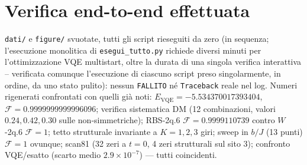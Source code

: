 \documentclass[11pt,a4paper]{article}
\begin{document}
\section{Verifica end-to-end effettuata}

\texttt{dati/} e \texttt{figure/} svuotate, tutti gli script rieseguiti
da zero (in sequenza; l'esecuzione monolitica di
\texttt{esegui\_tutto.py} richiede diversi minuti per l'ottimizzazione
VQE multistart, oltre la durata di una singola verifica interattiva --
verificata comunque l'esecuzione di ciascuno script preso singolarmente,
in ordine, da uno stato pulito): nessun \texttt{FALLITO} né
\texttt{Traceback} reale nel log. Numeri rigenerati confrontati con
quelli già noti: $E_\text{VQE}=-5.534370017393404$,
$\mathcal F=0.9999999999996096$; verifica sistematica DM (12
combinazioni, valori $0.24,0.42,0.30$ sulle non-simmetriche); RBS-2q.6
$\mathcal F=0.9999110739$ contro $W$-2q.6 $\mathcal F=1$; tetto
strutturale invariante a $K=1,2,3$ giri; sweep in $b/J$ (13 punti)
$\mathcal F=1$ ovunque; scan81 (32 zeri a $t{=}0$, 4 zeri strutturali
sul sito 3); confronto VQE/esatto (scarto medio $2.9\times10^{-7}$) ---
tutti coincidenti.
\end{document}
